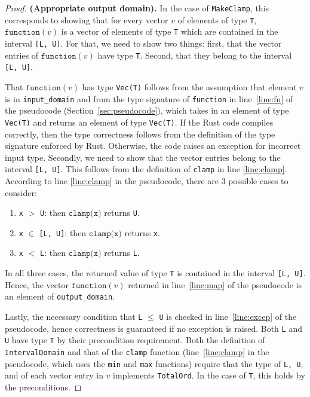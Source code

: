 \documentclass[11pt,a4paper]{article}
\theoremstyle{definition}
\newcommand{\T}{\texttt{T} }
\newcommand{\clamp}{\texttt{clamp}}
\newcommand{\function}{\texttt{function}}
\begin{document}
\begin{proof}
\textbf{(Appropriate output domain).} In the case of \texttt{MakeClamp}, this corresponds to showing that for every vector $v$ of elements of type \texttt{T}, $\function(v)$ is a vector of elements of type \texttt{T} which are contained in the interval \texttt{[L, U]}. For that, we need to show two things: first, that the vector entries of $\function(v)$ have type \texttt{T}. %
Second, that they belong to the interval \texttt{[L, U]}.

That $\function(v)$ has type \texttt{Vec(T)} follows from the assumption that element $v$ is in \texttt{input\_domain} and from the type signature of \texttt{function} in line~\ref{line:fn} of the pseudocode (Section~\ref{sec:pseudocode}), which takes in an element of type \texttt{Vec(T)} and returns an element of type \texttt{Vec(T)}. If the Rust code compiles correctly, then the type correctness follows from the definition of the type signature enforced by Rust. Otherwise, the code raises an exception for incorrect input type. Secondly, we need to show that the vector entries belong to the interval \texttt{[L, U]}. This follows from the definition of \texttt{clamp} in line \ref{line:clamp}. According to line \ref{line:clamp} in the pseudocode, there are 3 possible cases to consider:
\begin{enumerate}
    \item \texttt{x} $>$ \texttt{U}: then $\clamp\texttt{(x)}$ returns \texttt{U}.
    \item \texttt{x} $\in$ \texttt{[L, U]}: then $\clamp\texttt{(x)}$ returns \texttt{x}.
    \item \texttt{x} $<$ \texttt{L}: then $\clamp\texttt{(x)}$ returns \texttt{L}.
\end{enumerate}
In all three cases, the returned value of type \T is contained in the interval \texttt{[L, U]}. Hence, the vector $\function(v)$ returned in line~\ref{line:map} of the pseudocode is an element of \texttt{output\_domain}.

Lastly, the necessary condition that \texttt{L} $\leq$ \texttt{U} is checked in line~\ref{line:excep} of the pseudocode, hence correctness is guaranteed if no exception is raised. Both \texttt{L} and \texttt{U} have type \texttt{T} by their precondition requirement. Both the definition of \texttt{IntervalDomain} and that of the \texttt{clamp} function (line~\ref{line:clamp} in the pseudocode, which uses the \texttt{min} and \texttt{max} functions) require that the type of \texttt{L, U}, and of each vector entry in $v$ implements \texttt{TotalOrd}. In the case of \texttt{T}, this holds by the preconditions.


\end{proof}
\end{document}
